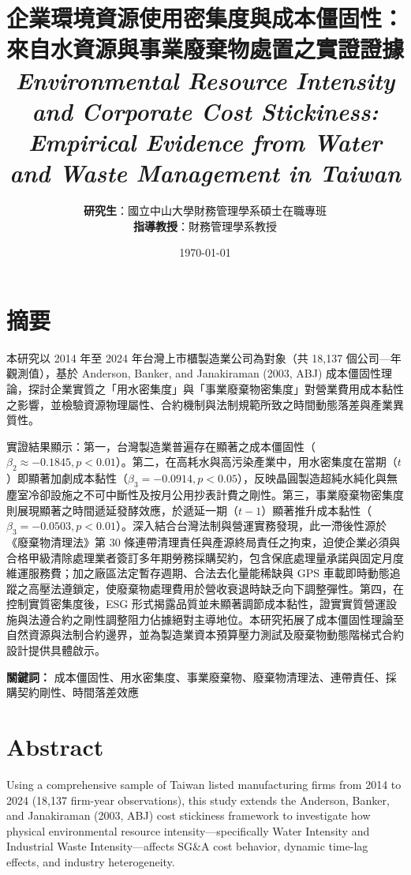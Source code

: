 \documentclass[12pt,a4paper]{article}
\title{\textbf{企業環境資源使用密集度與成本僵固性：\\來自水資源與事業廢棄物處置之實證證據}\\
\large\textit{Environmental Resource Intensity and Corporate Cost Stickiness:\\Empirical Evidence from Water and Waste Management in Taiwan}}
\author{\textbf{研究生}：國立中山大學財務管理學系碩士在職專班\\
\textbf{指導教授}：財務管理學系教授}
\date{\today}
\begin{document}
\maketitle
\thispagestyle{empty}

\section*{摘要}

本研究以 2014 年至 2024 年台灣上市櫃製造業公司為對象（共 18,137 個公司—年觀測值），基於 Anderson, Banker, and Janakiraman (2003, ABJ) 成本僵固性理論，探討企業實質之「用水密集度」與「事業廢棄物密集度」對營業費用成本黏性之影響，並檢驗資源物理屬性、合約機制與法制規範所致之時間動態落差與產業異質性。

實證結果顯示：第一，台灣製造業普遍存在顯著之成本僵固性（$\beta_2 \approx -0.1845, p < 0.01$）。第二，在高耗水與高污染產業中，用水密集度在當期（$t$）即顯著加劇成本黏性（$\beta_3 = -0.0914, p < 0.05$），反映晶圓製造超純水純化與無塵室冷卻設施之不可中斷性及按月公用抄表計費之剛性。第三，事業廢棄物密集度則展現顯著之時間遞延發酵效應，於遞延一期（$t-1$）顯著推升成本黏性（$\beta_3 = -0.0503, p < 0.01$）。深入結合台灣法制與營運實務發現，此一滯後性源於《廢棄物清理法》第 30 條連帶清理責任與產源終局責任之拘束，迫使企業必須與合格甲級清除處理業者簽訂多年期勞務採購契約，包含保底處理量承諾與固定月度維運服務費；加之廠區法定暫存週期、合法去化量能稀缺與 GPS 車載即時動態追蹤之高壓法遵鎖定，使廢棄物處理費用於營收衰退時缺乏向下調整彈性。第四，在控制實質密集度後，ESG 形式揭露品質並未顯著調節成本黏性，證實實質營運設施與法遵合約之剛性調整阻力佔據絕對主導地位。本研究拓展了成本僵固性理論至自然資源與法制合約邊界，並為製造業資本預算壓力測試及廢棄物動態階梯式合約設計提供具體啟示。

\vspace{1em}
\noindent \textbf{關鍵詞：} 成本僵固性、用水密集度、事業廢棄物、廢棄物清理法、連帶責任、採購契約剛性、時間落差效應

\newpage

\section*{Abstract}

Using a comprehensive sample of Taiwan listed manufacturing firms from 2014 to 2024 (18,137 firm-year observations), this study extends the Anderson, Banker, and Janakiraman (2003, ABJ) cost stickiness framework to investigate how physical environmental resource intensity—specifically Water Intensity and Industrial Waste Intensity—affects SG\&A cost behavior, dynamic time-lag effects, and industry heterogeneity.
\end{document}
